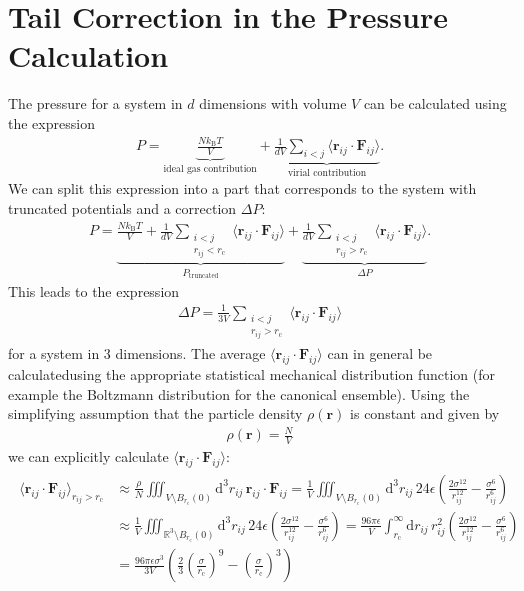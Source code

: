 \documentclass[a4paper,10pt,bibtotoc]{scrartcl}
\begin{document}
\section{Tail Correction in the Pressure Calculation}
The pressure for a system in $d$ dimensions with volume $V$ can be calculated using the expression
\begin{align}
P = \underbrace{\frac{Nk_\mathrm{B}T}{V}}_{\text{ideal gas contribution}} + \underbrace{\frac{1}{dV}\sum_{i<j}\langle\mathbf{r}_{ij}\cdot\mathbf{F}_{ij}\rangle}_{\text{virial contribution}}.
\end{align}
We can split this expression into a part that corresponds to the system with truncated potentials and a correction $\Delta P$:
\begin{align}
P = \underbrace{\frac{Nk_\mathrm{B}T}{V} + \frac{1}{dV}\sum_{\substack{i<j\\ r_{ij}<r_\mathrm{c}}}\langle\mathbf{r}_{ij}\cdot\mathbf{F}_{ij}\rangle}_{P_\text{truncated}} + \underbrace{\frac{1}{dV}\sum_{\substack{i<j\\ r_{ij}>r_\mathrm{c}}}\langle\mathbf{r}_{ij}\cdot\mathbf{F}_{ij}\rangle}_{\Delta P}.
\end{align}
This leads to the expression
\begin{align}
\Delta P = \frac{1}{3V}\sum_{\substack{i<j\\ r_{ij}>r_\mathrm{c}}}\langle\mathbf{r}_{ij}\cdot\mathbf{F}_{ij}\rangle
\end{align}
for a system in 3 dimensions. The average $\langle\mathbf{r}_{ij}\cdot\mathbf{F}_{ij}\rangle$ can in general be calculatedusing the appropriate statistical mechanical distribution function (for example the Boltzmann distribution for the canonical ensemble). Using the simplifying assumption that the particle density $\rho\left(\mathbf{r}\right)$ is constant and given by 
\begin{align}
\rho\left(\mathbf{r}\right) = \frac{N}{V}
\end{align}
we can explicitly calculate $\langle\mathbf{r}_{ij}\cdot\mathbf{F}_{ij}\rangle$:
\begin{align}
\begin{split}
\langle\mathbf{r}_{ij}\cdot\mathbf{F}_{ij}\rangle_{r_{ij}>r_\mathrm{c}} &\approx \frac{\rho}{N}\iiint_{V\setminus B_{r_\mathrm{c}}(0)}\mathrm{d}^3r_{ij}\,\mathbf{r}_{ij}\cdot\mathbf{F}_{ij}= \frac{1}{V}\iiint_{V\setminus B_{r_\mathrm{c}}(0)}\mathrm{d}^3r_{ij}\,24\epsilon\left(\frac{2\sigma^{12}}{r_{ij}^{12}}-\frac{\sigma^6}{r_{ij}^6}\right)\\ &
\approx \frac{1}{V}\iiint_{\mathbb{R}^3\setminus B_{r_\mathrm{c}}(0)}\mathrm{d}^3r_{ij}\,24\epsilon\left(\frac{2\sigma^{12}}{r_{ij}^{12}}-\frac{\sigma^6}{r_{ij}^6}\right)= \frac{96\pi\epsilon}{V}\int_{r_\mathrm{c}}^{\infty}\mathrm{d}r_{ij}\,r_{ij}^2\left(\frac{2\sigma^{12}}{r_{ij}^{12}}-\frac{\sigma^6}{r_{ij}^6}\right)\\ &= \frac{96\pi\epsilon\sigma^3}{3V}\left(\frac{2}{3}\left(\frac{\sigma}{r_\mathrm{c}}\right)^9-\left(\frac{\sigma}{r_\mathrm{c}}\right)^3\right)
\end{split}
\end{align}
\end{document}
